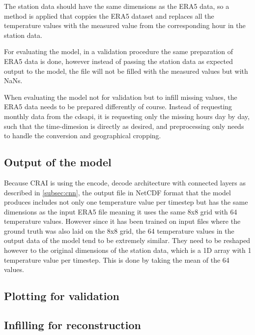 The station data should have the same dimensions as the ERA5 data, so a method is applied that coppies the ERA5 dataset and replaces all the temperature values with the measured value from the corresponding hour in the station data.

For evaluating the model, in a validation procedure the same preparation of ERA5 data is done, however instead of passing the station data as expected output to the model, the file will not be filled with the measured values but with NaNs.

When evaluating the model not for validation but to infill missing values, the ERA5 data needs to be prepared differently of course. Instead of requesting monthly data from the cdsapi, it is requesting only the missing hours day by day, such that the time-dimesion is directly as desired, and preprocessing only needs to handle the conversion and geographical cropping.

\subsection{Output of the model}

Because CRAI is using the encode, decode architecture with connected layers as described in \autoref{subsec:cnn}, the output file in NetCDF format that the model produces includes not only one temperature value per timestep but has the same dimensions as the input ERA5 file meaning it uses the same 8x8 grid with 64 temperature values. However since it has been trained on input files where the ground truth was also laid on the 8x8 grid, the 64 temperature values in the output data of the model tend to be extremely similar. They need to be reshaped however to the original dimensions of the station data, which is a 1D array with 1 temperature value per timestep. This is done by taking the mean of the 64 values. 

\subsection{Plotting for validation}




\subsection{Infilling for reconstruction}

